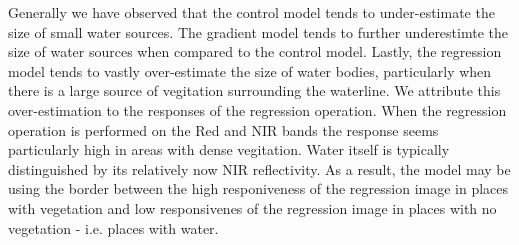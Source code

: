 \documentclass[12pt]{article}
\begin{document}
\begin{figure}[H]
\end{figure}
\begin{figure}[H]
\end{figure}
\begin{figure}[H]
\end{figure}

Generally we have observed that the control model tends to under-estimate the size of small water sources. The gradient model tends to further underestimte the size of water sources when compared to the control model. Lastly, the regression model tends to vastly over-estimate the size of water bodies, particularly when there is a large source of vegitation surrounding the waterline. We attribute this over-estimation to the responses of the regression operation. When the regression operation is performed on the Red and NIR bands the response seems particularly high in areas with dense vegitation. Water itself is typically distinguished by its relatively now NIR reflectivity. As a result, the model may be using the border between the high responiveness of the regression image in places with vegetation and low responsivenes of the regression image in places with no vegetation - i.e. places with water.
\\
\end{document}
